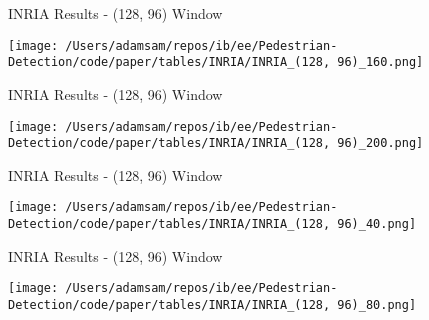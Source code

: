 \begin{table}
    \caption{INRIA Results - (128, 96) Window}
    \texttt{[image: /Users/adamsam/repos/ib/ee/Pedestrian-Detection/code/paper/tables/INRIA/INRIA\_(128, 96)\_160.png]}
    \label{tab:INRIA_(128, 96)_160}
\end{table}

\begin{table}
    \caption{INRIA Results - (128, 96) Window}
    \texttt{[image: /Users/adamsam/repos/ib/ee/Pedestrian-Detection/code/paper/tables/INRIA/INRIA\_(128, 96)\_200.png]}
    \label{tab:INRIA_(128, 96)_200}
\end{table}

\begin{table}
    \caption{INRIA Results - (128, 96) Window}
    \texttt{[image: /Users/adamsam/repos/ib/ee/Pedestrian-Detection/code/paper/tables/INRIA/INRIA\_(128, 96)\_40.png]}
    \label{tab:INRIA_(128, 96)_40}
\end{table}

\begin{table}
    \caption{INRIA Results - (128, 96) Window}
    \texttt{[image: /Users/adamsam/repos/ib/ee/Pedestrian-Detection/code/paper/tables/INRIA/INRIA\_(128, 96)\_80.png]}
    \label{tab:INRIA_(128, 96)_80}
\end{table}
